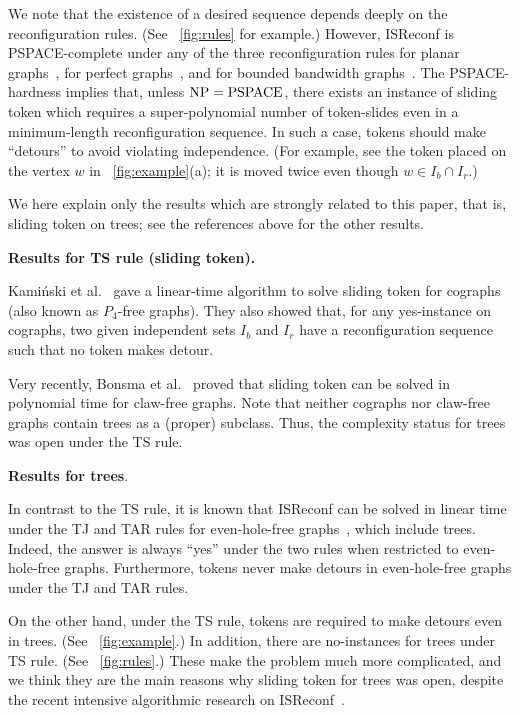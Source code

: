 \documentclass{llncs}
\newcommand{\bfI}{I}
\newcounter{two}
\newcounter{three}
\begin{document}
\noindent
 	We note that the existence of a desired sequence depends deeply on the reconfiguration rules. 
 (See \figurename~\ref{fig:rules} for example.) 
	However, {\sc ISReconf} is PSPACE-complete under any of the three reconfiguration rules for planar graphs~\cite{BC09,HearnDemaine2005,HearnDemaine2009}, for perfect graphs~\cite{KaminskiMedvedevMilanic2012}, and for bounded bandwidth graphs~\cite{Wro14}.
	The PSPACE-hardness implies that, unless ${\rm NP} = {\rm PSPACE}$, there exists an instance of {\sc sliding token} which requires a super-polynomial number of token-slides even in a minimum-length reconfiguration sequence. 
In such a case, tokens should make ``detours'' to avoid violating independence.
(For example, see the token placed on the vertex $w$ in \figurename~\ref{fig:example}(a);
it is moved twice even though $w \in \bfI_b \cap \bfI_r$.)


	We here explain only the results which are strongly related to this paper, that is, {\sc sliding token} on trees;
see the references above for the other results.  
\medskip

\noindent
{\bf Results for TS rule ({\sc sliding token}).}

	Kami\'nski et al.~\cite{KaminskiMedvedevMilanic2012} gave a linear-time algorithm to solve {\sc sliding token} for cographs 
(also known as $P_4$-free graphs). 
	They also showed that, for any yes-instance on cographs, two given independent sets $\bfI_b$ and $\bfI_r$ have a reconfiguration sequence such that no token makes detour. 

	Very recently, Bonsma et al.~\cite{BKW14} proved that {\sc sliding token} can be solved in polynomial time for claw-free graphs. 
	Note that neither cographs nor claw-free graphs contain trees as a (proper) subclass. 
	Thus, the complexity status for trees was open under the TS rule. 
\medskip


\noindent
{\bf Results for trees}.

	In contrast to the TS rule, it is known that {\sc ISReconf} can be solved in linear time under the TJ and TAR rules for even-hole-free graphs~\cite{KaminskiMedvedevMilanic2012}, which include trees. 
	Indeed, the answer is always ``yes'' under the two rules when restricted to even-hole-free graphs.
Furthermore, tokens never make detours in even-hole-free graphs under the TJ and TAR rules.

	On the other hand, under the TS rule, tokens are required to make detours even in trees.
(See \figurename~\ref{fig:example}.)
	In addition, there are no-instances for trees under TS rule.
(See \figurename~\ref{fig:rules}.)
	These make the problem much more complicated, and we think they are the main reasons why {\sc sliding token} for trees was open, despite the recent intensive algorithmic research on {\sc ISReconf}~\cite{BB14,Bon14,BKW14,ItoKaminskiOnoSuzukiUeharaYamanaka2014,KaminskiMedvedevMilanic2012,MNRW14}. 
\end{document}
